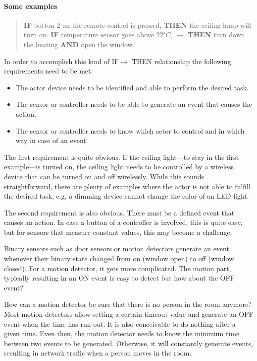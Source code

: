 \paragraph{Some examples}
\begin{quote}
\textbf{IF} button 2 on the remote control is pressed, \textbf{THEN} the ceiling 
lamp will turn on. \textbf{IF} temperature sensor goes above $22^\circ C$, $\rightarrow$ 
\textbf{THEN} turn down the heating \textbf{AND} open the window.
\end{quote}

In order to accomplish this kind of IF$\rightarrow$ THEN relationship the following 
requirements need to be met:

\begin{itemize}
\item The actor device needs to be identified and able to perform the desired task.
\item The sensor or controller needs to be able to generate an event that causes the action.
\item The sensor or controller needs to know which actor to control and in which way in 
case of an event.
\end{itemize}

The first requirement is quite obvious. If the ceiling light---to stay in the first 
example---is turned on, the ceiling light needs to be controlled by a wireless device that 
can be turned on and off wirelessly.
While this sounds straightforward, there are plenty of examples where the actor is not 
able to fulfill the desired task, e.g. a dimming device cannot change the color of an LED light.

The second requirement is also obvious. There must be a defined event that causes an 
action. In case a button of a controller is involved, this is quite easy, but for sensors 
that measure constant values, this may become a challenge.

Binary sensors such as door sensors or motion detectors generate an event whenever their 
binary state changed from on (window open) to off (window closed). For a motion detector, 
it gets more complicated. The motion part, typically resulting in an ON event is easy to 
detect but how about the OFF event?

How can a motion detector be sure that there is no person in the room anymore? Most motion 
detectors allow setting a certain timeout value and generate an OFF event when the time 
has run out. It is also conceivable to do nothing after a given time. Even then, the motion 
detector needs to know the minimum time between two events to be generated. Otherwise, 
it will constantly generate events, resulting in network traffic when a person moves in 
the room.

